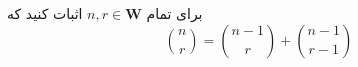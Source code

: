 برای تمام
$n, r \in \mathbf{W}$
اثبات کنید که
\begin{equation*}
	\binom{n}{r} = \binom{n-1}{r} + \binom{n-1}{r-1}
\end{equation*}